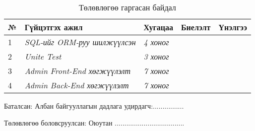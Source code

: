 \begin{table}[h]
	\centering
	\caption{Төлөвлөгөө гаргасан байдал}
	\label{my-label}
	\begin{tabular}{|l|l|l|l|l|}
	\hline
	\textbf{№} & \textbf{Гүйцэтгэх ажил}  & \textbf{Хугацаа} & \textbf{Биелэлт} & \textbf{Үнэлгээ} \\ \hline
	1& \textit{SQL-ийг ORM-руу шилжүүлсэн} &\textit{4 хоног}&                  &                 \\ \hline
	2&\textit{Unite Test}&\textit{3 хоног}&        &                \\ \hline
	3&\textit{Admin Front-End хөгжүүлэлт}&\textit{7 хоног}&                  &                  \\ \hline
	4&\textit{Admin Back-End хөгжүүлэлт}&\textit{7 хоног}&                  &                  \\ \hline
	
	\end{tabular}
	\end{table}
	
	Баталсан: Албан байгууллагын дадлага удирдагч:................\par
	Төлөвлөгөө боловсруулсан: Оюутан ....................................
	